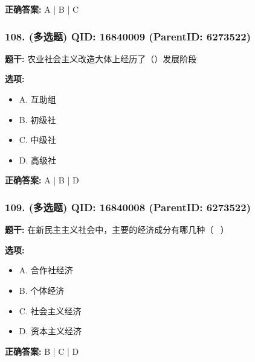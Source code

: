\documentclass[12pt,UTF8]{ctexart}
\begin{document}
\textbf{正确答案:}
A | B | C

\vspace{0.3em}\hrulefill\vspace{0.7em}

\subsubsection*{108. (多选题) \small QID: 16840009 (ParentID: 6273522)}

\textbf{题干:}
农业社会主义改造大体上经历了（）发展阶段



\textbf{选项:}
\begin{itemize}[leftmargin=*]

  \item A. 互助组

  \item B. 初级社

  \item C. 中级社

  \item D. 高级社

\end{itemize}

\textbf{正确答案:}
A | B | D

\vspace{0.3em}\hrulefill\vspace{0.7em}

\subsubsection*{109. (多选题) \small QID: 16840008 (ParentID: 6273522)}

\textbf{题干:}
在新民主主义社会中，主要的经济成分有哪几种（  ）



\textbf{选项:}
\begin{itemize}[leftmargin=*]

  \item A. 合作社经济

  \item B. 个体经济

  \item C. 社会主义经济

  \item D. 资本主义经济

\end{itemize}

\textbf{正确答案:}
B | C | D
\end{document}
